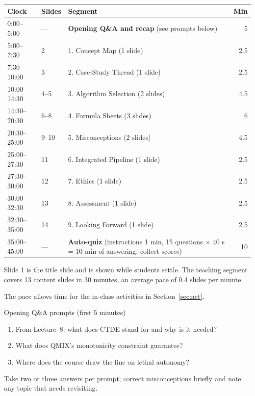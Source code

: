 \documentclass[11pt]{article}
\begin{document}
\begin{center}\small\renewcommand{\arraystretch}{1.2}\begin{tabularx}{\textwidth}{@{}l l X r@{}}\toprule\textbf{Clock} & \textbf{Slides} & \textbf{Segment} & \textbf{Min}\\\midrule

0:00--5:00 & --- & \textbf{Opening Q\&A and recap} (see prompts below) & 5\\

5:00--7:30 & 2 & 1. Concept Map (1 slide) & 2.5\\

7:30--10:00 & 3 & 2. Case-Study Thread (1 slide) & 2.5\\

10:00--14:30 & 4--5 & 3. Algorithm Selection (2 slides) & 4.5\\

14:30--20:30 & 6--8 & 4. Formula Sheets (3 slides) & 6\\

20:30--25:00 & 9--10 & 5. Misconceptions (2 slides) & 4.5\\

25:00--27:30 & 11 & 6. Integrated Pipeline (1 slide) & 2.5\\

27:30--30:00 & 12 & 7. Ethics (1 slide) & 2.5\\

30:00--32:30 & 13 & 8. Assessment (1 slide) & 2.5\\

32:30--35:00 & 14 & 9. Looking Forward (1 slide) & 2.5\\

35:00--45:00 & --- & \textbf{Auto-quiz} (instructions 1 min, 15 questions $\times$ 40 s = 10 min of answering; collect scores) & 10\\\bottomrule\end{tabularx}\end{center}

Slide 1 is the title slide and is shown while students settle. The teaching segment covers 13 content slides in 30 minutes, an average pace of 0.4 slides per minute. 

The pace allows time for the in-class activities in Section~\ref{sec:act}.

\begin{instr}{Opening Q\&A prompts (first 5 minutes)}\begin{enumerate}\item From Lecture~8: what does CTDE stand for and why is it needed?\item What does QMIX's monotonicity constraint guarantee?\item Where does the course draw the line on lethal autonomy?\end{enumerate}Take two or three answers per prompt; correct misconceptions briefly and note any topic that needs revisiting.\end{instr}
\end{document}
